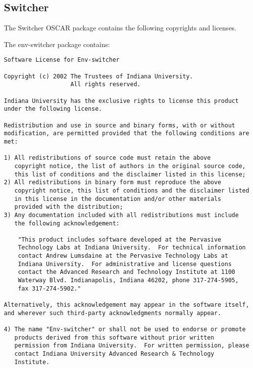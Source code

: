 %
%
%
%

\subsection{Switcher}
The Switcher OSCAR package contains the following copyrights and licenses.

The env-switcher package contains:

\begin{verbatim}
Software License for Env-switcher

Copyright (c) 2002 The Trustees of Indiana University.  
                   All rights reserved.

Indiana University has the exclusive rights to license this product
under the following license.

Redistribution and use in source and binary forms, with or without
modification, are permitted provided that the following conditions are
met:

1) All redistributions of source code must retain the above
   copyright notice, the list of authors in the original source code,
   this list of conditions and the disclaimer listed in this license; 
2) All redistributions in binary form must reproduce the above
   copyright notice, this list of conditions and the disclaimer listed
   in this license in the documentation and/or other materials
   provided with the distribution; 
3) Any documentation included with all redistributions must include
   the following acknowledgement:

    "This product includes software developed at the Pervasive
    Technology Labs at Indiana University.  For technical information
    contact Andrew Lumsdaine at the Pervasive Technology Labs at
    Indiana University.  For administrative and license questions
    contact the Advanced Research and Technology Institute at 1100
    Waterway Blvd. Indianapolis, Indiana 46202, phone 317-274-5905,
    fax 317-274-5902."

Alternatively, this acknowledgement may appear in the software itself,
and wherever such third-party acknowledgments normally appear.

4) The name "Env-switcher" or shall not be used to endorse or promote
   products derived from this software without prior written
   permission from Indiana University.  For written permission, please
   contact Indiana University Advanced Research & Technology
   Institute.


\end{verbatim}
